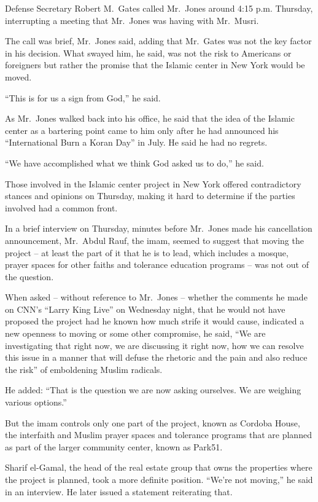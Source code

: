 ﻿\documentclass[12pt]{article}
\begin{document}
Defense Secretary Robert M.~Gates called Mr.~Jones around 4:15 p.m. Thursday, interrupting a meeting
that Mr.~Jones was having with Mr.~Musri.

The call was brief, Mr.~Jones said, adding that Mr.~Gates was not the key factor in his decision.
What swayed him, he said, was not the risk to Americans or foreigners but rather the promise that
the Islamic center in New York would be moved.

``This is for us a sign from God,'' he said.

As Mr.~Jones walked back into his office, he said that the idea of the Islamic center as a bartering
point came to him only after he had announced his ``International Burn a Koran Day'' in July. He
said he had no regrets.

``We have accomplished what we think God asked us to do,'' he said.

Those involved in the Islamic center project in New York offered contradictory stances and opinions
on Thursday, making it hard to determine if the parties involved had a common front.

In a brief interview on Thursday, minutes before Mr.~Jones made his cancellation announcement,
Mr.~Abdul Rauf, the imam, seemed to suggest that moving the project -- at least the part of it that
he is to lead, which includes a mosque, prayer spaces for other faiths and tolerance education
programs -- was not out of the question.

When asked -- without reference to Mr.~Jones -- whether the comments he made on CNN's ``Larry King
Live'' on Wednesday night, that he would not have proposed the project had he known how much strife
it would cause, indicated a new openness to moving or some other compromise, he said, ``We are
investigating that right now, we are discussing it right now, how we can resolve this issue in a
manner that will defuse the rhetoric and the pain and also reduce the risk'' of emboldening Muslim
radicals.

He added: ``That is the question we are now asking ourselves. We are weighing various options.''

But the imam controls only one part of the project, known as Cordoba House, the interfaith and
Muslim prayer spaces and tolerance programs that are planned as part of the larger community center,
known as Park51.

Sharif el-Gamal, the head of the real estate group that owns the properties where the project is
planned, took a more definite position. ``We're not moving,'' he said in an interview. He later
issued a statement reiterating that.
\end{document}
